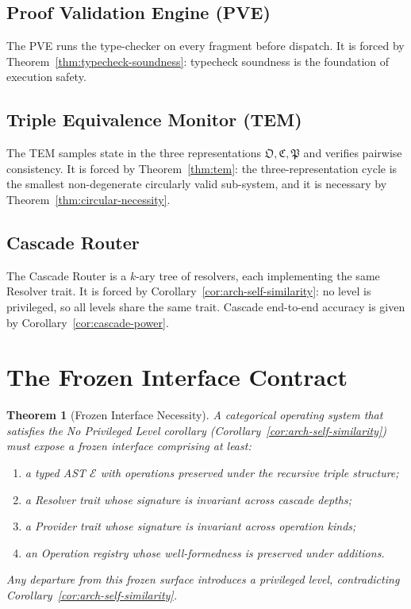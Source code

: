 \documentclass[twocolumn,a4paper]{article}
\newtheorem{theorem}{Theorem}[section]
\newcommand{\Expr}{\mathcal{E}}
\newcommand{\OOsc}{\mathfrak{O}}
\newcommand{\CCat}{\mathfrak{C}}
\newcommand{\PPart}{\mathfrak{P}}
\begin{document}
\subsection{Proof Validation Engine (PVE)}

The PVE runs the type-checker on every fragment before dispatch. It is forced by Theorem~\ref{thm:typecheck-soundness}: typecheck soundness is the foundation of execution safety.

\subsection{Triple Equivalence Monitor (TEM)}

The TEM samples state in the three representations $\OOsc,\CCat,\PPart$ and verifies pairwise consistency. It is forced by Theorem~\ref{thm:tem}: the three-representation cycle is the smallest non-degenerate circularly valid sub-system, and it is necessary by Theorem~\ref{thm:circular-necessity}.

\subsection{Cascade Router}

The Cascade Router is a $k$-ary tree of resolvers, each implementing the same Resolver trait. It is forced by Corollary~\ref{cor:arch-self-similarity}: no level is privileged, so all levels share the same trait. Cascade end-to-end accuracy is given by Corollary~\ref{cor:cascade-power}.

\section{The Frozen Interface Contract}
\label{sec:frozen-interface}

\begin{theorem}[Frozen Interface Necessity]
\label{thm:frozen-interface}
A categorical operating system that satisfies the No Privileged Level corollary (Corollary~\ref{cor:arch-self-similarity}) must expose a frozen interface comprising at least:
\begin{enumerate}[nosep,label=(\arabic*)]
\item a typed AST $\Expr$ with operations preserved under the recursive triple structure;
\item a Resolver trait whose signature is invariant across cascade depths;
\item a Provider trait whose signature is invariant across operation kinds;
\item an Operation registry whose well-formedness is preserved under additions.
\end{enumerate}
Any departure from this frozen surface introduces a privileged level, contradicting Corollary~\ref{cor:arch-self-similarity}.
\end{theorem}
\end{document}
